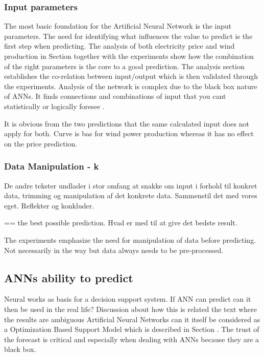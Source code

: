 \subsubsection{Input parameters}
The most basic foundation for the Artificial Neural Network is the input parameters. The need for identifying what influences the value to predict is the first step when predicting. The analysis of both electricity price and wind production in Section together with the experiments show how the combination of the right parameters is the core to a good prediction. The analysis section establishes the co-relation between input/output which is then validated through the experiments. Analysis of the network is complex due to the black box nature of ANNs. It finds connections and combinations of input that you cant statistically or logically foresee .

It is obvious from the two predictions that the same calculated input does not apply for both. Curve is bas for wind power production whereas it has no effect on the price prediction.


\subsubsection{Data Manipulation - k}
De andre tekster undlader i stor omfang at snakke om input i forhold til konkret data, trimming og manipulation af det konkrete data. Sammenstil det med vores eget. Reflekter og konkluder.

== the best possible prediction. Hvad er med til at give det bedste result.

The experiments emphasize the need for manipulation of data before predicting. Not necessarily in the way but data always needs to be pre-processed. 

\subsection{ANNs ability to predict}


Neural works as basis for a decision support system. If ANN can predict can it then be used in the real life? Discussion about how this is related the text where the results are ambiguous 
Artificial Neural Networks can it itself be considered as a Optimization Based Support Model which is described in Section . The trust of the forecast is critical and especially when dealing with ANNs because they are a black box. 

